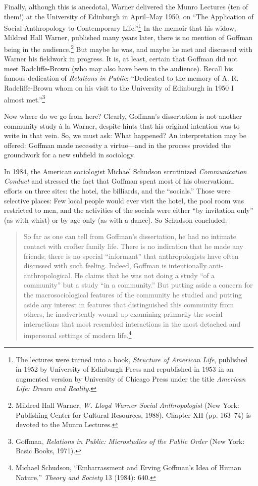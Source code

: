 \documentclass[openany,nobib]{tufte-book}
\begin{document}
Finally, although this is anecdotal, Warner delivered the Munro Lectures
(ten of them!) at the University of Edinburgh in April--May 1950, on
``The Application of Social Anthropology to Contemporary
Life.''\footnote{The lectures were turned into a book, \emph{Structure
  of American Life}, published in 1952 by University of Edinburgh Press
  and republished in 1953 in an augmented version by University of
  Chicago Press under the title \emph{American Life: Dream and Reality}.}
In the memoir that his widow, Mildred Hall Warner, published many years
later, there is no mention of Goffman being in the audience.\footnote{Mildred
  Hall Warner, \emph{W. Lloyd Warner Social Anthropologist} (New York:
  Publishing Center for Cultural Resources, 1988). Chapter XII (pp.
  163--74) is devoted to the Munro Lectures.} But maybe he was, and
maybe he met and discussed with Warner his fieldwork in progress. It is,
at least, certain that Goffman did not meet Radcliffe-Brown (who may
also have been in the audience). Recall his famous dedication of
\emph{Relations in Public}: ``Dedicated to the memory of A. R.
Radcliffe-Brown whom on his visit to the University of Edinburgh in 1950
I almost met.''\footnote{Goffman, \emph{Relations in Public:
  Microstudies of the Public Order} (New York: Basic Books, 1971).}

Now where do we go from here? Clearly, Goffman's dissertation is not
another community study à la Warner, despite hints that his original
intention was to write in that vein. So, we must ask: What happened? An
interpretation may be offered: Goffman made necessity a virtue---and in
the process provided the groundwork for a new subfield in sociology.

In 1984, the American sociologist Michael Schudson scrutinized
\emph{Communication Conduct} and stressed the fact that Goffman spent
most of his observational efforts on three sites: the hotel, the
billiards, and the ``socials.'' Those were selective places: Few local
people would ever visit the hotel, the pool room was restricted to men,
and the activities of the socials were either ``by invitation only'' (as
with whist) or by age only (as with a dance). So Schudson concluded:

\begin{quote}
So far as one can tell from Goffman's dissertation, he had no intimate
contact with crofter family life. There is no indication that he made
any friends; there is no special ``informant'' that anthropologists have
often discussed with such feeling. Indeed, Goffman is intentionally
anti-anthropological. He claims that he was not doing a study ``of a
community'' but a study ``in a community.'' But putting aside a concern
for the macrosociological features of the community he studied and
putting aside any interest in features that distinguished this community
from others, he inadvertently wound up examining primarily the social
interactions that most resembled interactions in the most detached and
impersonal settings of modern life.\footnote{Michael Schudson,
  ``Embarrassment and Erving Goffman's Idea of Human Nature,''
  \emph{Theory and Society} 13 (1984): 640.}
\end{quote}
\end{document}
